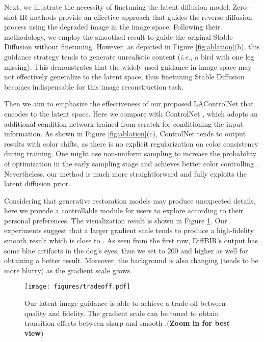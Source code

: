 \documentclass{article}
\begin{document}
\label{sec:ablation2}
Next, we illustrate the necessity of finetuning the latent diffusion model. 
Zero-shot IR methods \cite{ddnm, gdp} provide an effective approach that guides the reverse diffusion process using the degraded image in the image space. 
Following their methodology, we employ the smoothed result  to guide the original Stable Diffusion without finetuning. However, as depicted in Figure \ref{fig:ablation}(b),
this guidance strategy tends to generate unrealistic content (\textit{i.e.,} a bird with one leg missing). 
This demonstrates that the widely used guidance in image space may not effectively generalize to the latent space, thus finetuning Stable Diffusion becomes indispensable for this image reconstruction task. 

\label{sec:ablation3}
Then we aim to emphasize the effectiveness of our proposed LAControlNet that encodes  to the latent space. Here we compare with ControlNet \cite{controlnet}, which adopts an additional condition network trained from scratch for conditioning the input information. As shown in Figure \ref{fig:ablation}(c), ControlNet tends to output results with color shifts, as there is no explicit regularization on color consistency during training. One might use non-uniform sampling to increase the probability of optimization in the early sampling stage and achieves better color controlling \cite{t2iadapter}. Nevertheless, our method is much more straightforward and fully exploits the latent diffusion prior.

\label{sec:ablation4}
Considering that generative restoration models may produce unexpected details, here we provide a controllable module for users to explore according to their personal preferences. The visualization result is shown in Figure \ref{fig:tradeoff}.
Our experiments suggest that a larger gradient scale  tends to produce a high-fidelity smooth result which is close to . As seen from the first row, DiffBIR's output  has some blue artifacts in the dog's eyes, thus we set  to 200 and higher as well for obtaining a better result. Moreover, the background is also changing (tends to be more blurry) as the gradient scale  grows.

\begin{figure}[htbp]
\centering
\texttt{[image: figures/tradeoff.pdf]}
\caption{\small Our latent image guidance is able to achieve a trade-off between quality and fidelity. The gradient scale can be tuned to obtain transition effects between sharp  and smooth .(\textbf{Zoom in for best view})}
\label{fig:tradeoff}
\end{figure}
\end{document}

